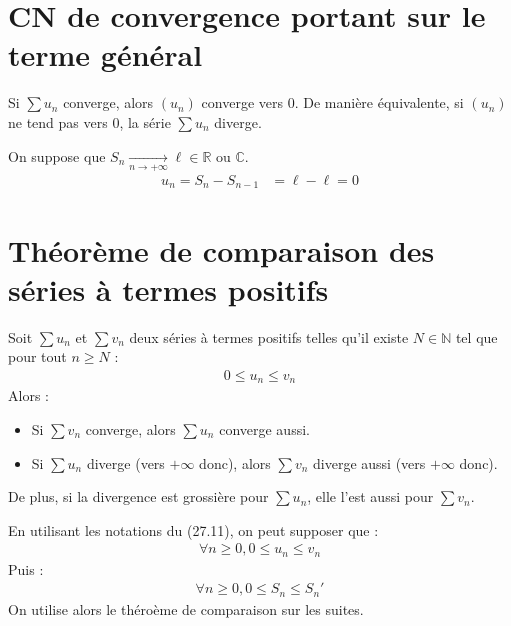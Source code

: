 \documentclass[../main.tex]{subfiles}
\begin{document}
\section{CN de convergence portant sur le terme général}
\begin{tcolorbox}[title=Théorème 27.12, title filled=false, colframe=orange, colback=orange!10!white]
    Si $\sum u_n$ converge, alors $(u_n)$ converge vers $0$. De manière équivalente, si $(u_n)$ ne tend pas vers $0$, la série $\sum u_n$ diverge.
\end{tcolorbox}

\noindent On suppose que $S_n \underset{n \to +\infty}{\longrightarrow} \ell \in \mathbb{R} \text{ ou } \mathbb{C}$. \\
\begin{align*}
    u_n = S_n - S_{n-1} &= \ell - \ell = 0
\end{align*}

\section{Théorème de comparaison des séries à termes positifs}
\begin{tcolorbox}[title=Théorème 27.16, title filled=false, colframe=orange, colback=orange!10!white]
    Soit $\sum u_n$ et $\sum v_n$ deux séries à termes positifs telles qu'il existe $N\in \mathbb{N}$ tel que pour tout $n\geq N$ : 
    \begin{align*}
        0\leq u_n \leq v_n
    \end{align*}
    Alors : 
    \begin{itemize}
        \item Si $\sum v_n$ converge, alors $\sum u_n$ converge aussi. 
        \item Si $\sum u_n$ diverge (vers $+\infty$ donc), alors $\sum v_n$ diverge aussi (vers $+\infty$ donc).
    \end{itemize}
    De plus, si la divergence est grossière pour $\sum u_n$, elle l'est aussi pour $\sum v_n$. 
\end{tcolorbox}

\noindent En utilisant les notations du (27.11), on peut supposer que : 
\begin{align*}
    \forall n \geq 0, 0\leq u_n \leq v_n
\end{align*}
Puis : 
\begin{align*}
    \forall n \geq 0, 0\leq S_n \leq S_n'
\end{align*}
On utilise alors le théroème de comparaison sur les suites. 
\end{document}

